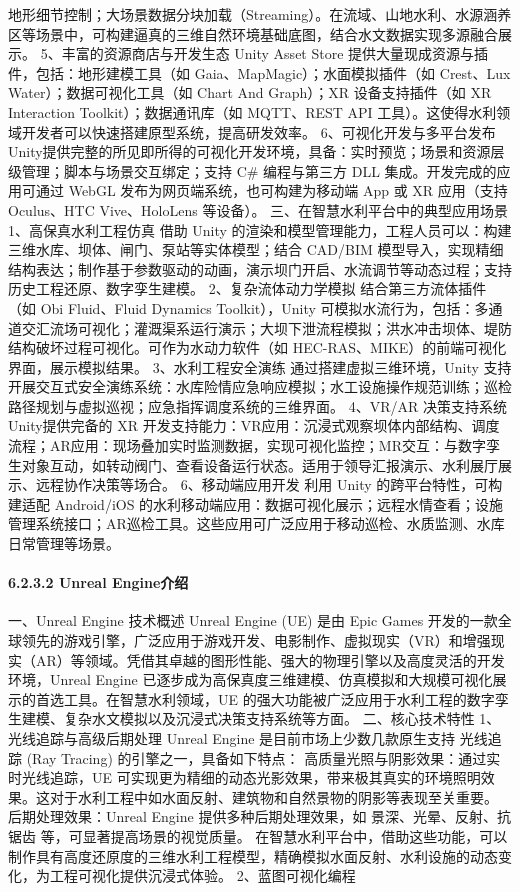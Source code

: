 地形细节控制；大场景数据分块加载（Streaming）。在流域、山地水利、水源涵养区等场景中，可构建逼真的三维自然环境基础底图，结合水文数据实现多源融合展示。 5、丰富的资源商店与开发生态 Unity Asset Store 提供大量现成资源与插件，包括：地形建模工具（如 Gaia、MapMagic）；水面模拟插件（如 Crest、Lux Water）；数据可视化工具（如 Chart And Graph）；XR 设备支持插件（如 XR Interaction Toolkit）；数据通讯库（如 MQTT、REST API 工具）。这使得水利领域开发者可以快速搭建原型系统，提高研发效率。 6、可视化开发与多平台发布 Unity提供完整的所见即所得的可视化开发环境，具备：实时预览；场景和资源层级管理；脚本与场景交互绑定；支持 C\# 编程与第三方 DLL 集成。开发完成的应用可通过 WebGL 发布为网页端系统，也可构建为移动端 App 或 XR 应用（支持 Oculus、HTC Vive、HoloLens 等设备）。 三、在智慧水利平台中的典型应用场景 1、高保真水利工程仿真 借助 Unity 的渲染和模型管理能力，工程人员可以：构建三维水库、坝体、闸门、泵站等实体模型；结合 CAD/BIM 模型导入，实现精细结构表达；制作基于参数驱动的动画，演示坝门开启、水流调节等动态过程；支持历史工程还原、数字孪生建模。 2、复杂流体动力学模拟 结合第三方流体插件（如 Obi Fluid、Fluid Dynamics Toolkit），Unity 可模拟水流行为，包括：多通道交汇流场可视化；灌溉渠系运行演示；大坝下泄流程模拟；洪水冲击坝体、堤防结构破坏过程可视化。可作为水动力软件（如 HEC-RAS、MIKE）的前端可视化界面，展示模拟结果。 3、水利工程安全演练 通过搭建虚拟三维环境，Unity 支持开展交互式安全演练系统：水库险情应急响应模拟；水工设施操作规范训练；巡检路径规划与虚拟巡视；应急指挥调度系统的三维界面。 4、VR/AR 决策支持系统 Unity提供完备的 XR 开发支持能力：VR应用：沉浸式观察坝体内部结构、调度流程；AR应用：现场叠加实时监测数据，实现可视化监控；MR交互：与数字孪生对象互动，如转动阀门、查看设备运行状态。适用于领导汇报演示、水利展厅展示、远程协作决策等场合。 6、移动端应用开发 利用 Unity 的跨平台特性，可构建适配 Android/iOS 的水利移动端应用：数据可视化展示；远程水情查看；设施管理系统接口；AR巡检工具。这些应用可广泛应用于移动巡检、水质监测、水库日常管理等场景。 \paragraph{6.2.3.2 Unreal Engine介绍}\label{unreal-engineux4ecbux7ecd} 一、Unreal Engine 技术概述 Unreal Engine (UE) 是由 Epic Games 开发的一款全球领先的游戏引擎，广泛应用于游戏开发、电影制作、虚拟现实（VR）和增强现实（AR）等领域。凭借其卓越的图形性能、强大的物理引擎以及高度灵活的开发环境，Unreal Engine 已逐步成为高保真度三维建模、仿真模拟和大规模可视化展示的首选工具。在智慧水利领域，UE 的强大功能被广泛应用于水利工程的数字孪生建模、复杂水文模拟以及沉浸式决策支持系统等方面。 二、核心技术特性 1、光线追踪与高级后期处理 Unreal Engine 是目前市场上少数几款原生支持 光线追踪 (Ray Tracing) 的引擎之一，具备如下特点： 高质量光照与阴影效果：通过实时光线追踪，UE 可实现更为精细的动态光影效果，带来极其真实的环境照明效果。这对于水利工程中如水面反射、建筑物和自然景物的阴影等表现至关重要。 后期处理效果：Unreal Engine 提供多种后期处理效果，如 景深、光晕、反射、抗锯齿 等，可显著提高场景的视觉质量。 在智慧水利平台中，借助这些功能，可以制作具有高度还原度的三维水利工程模型，精确模拟水面反射、水利设施的动态变化，为工程可视化提供沉浸式体验。 2、蓝图可视化编程 